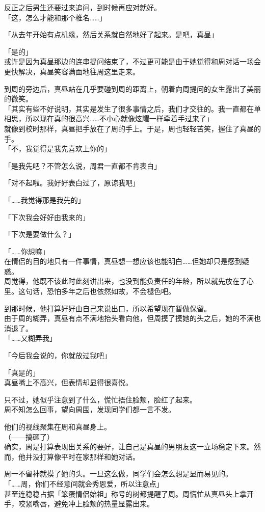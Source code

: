 反正之后男生还要过来追问，到时候再应对就好。\\

「这，怎么才能和那个椎名……」

「从去年开始有点机缘，然后关系就自然地好了起来。是吧，真昼」

「是的」\\

或许是因为真昼那边的连串提问结束了，不过更可能是由于她觉得和周对话一场会更快解决，真昼笑容满面地往周这里走来。

到周的旁边后，真昼站在几乎要碰到周的距离上，朝着向周提问的女生露出了美丽的微笑。\\

「其实有些不好说明，其实是发生了很多事情之后，我们才交往的。我一直都在单相思，所以现在真的很高兴……不小心就像炫耀一样牵着手过来了」\\

就像到校时那样，真昼把手放在了周的手上。于是，周也轻轻苦笑，握住了真昼的手。\\

「不，我觉得是我先喜欢上你的」

「是我先吧？不管怎么说，周君一直都不肯表白」

「对不起啦。我好好表白过了，原谅我吧」

「……我觉得那是我先的」

「下次我会好好由我来的」

「下次是要做什么？」

「……你想嘛」\\

在情侣的目的地只有一件事情，真昼想一想应该也能明白……但她却只是感到疑惑。\\

周觉得，他既不该此时此刻讲出来，也没到能负责任的年龄，所以就先放在了心里。这句话，恐怕多年之后也依然如故，不会褪色吧。

到那时候，他打算好好由自己来说出口，所以希望现在暂做保留。\\

由于周的糊弄，真昼有点不满地抬头看向他，但周摸了摸她的头之后，她的不满也消退了。\\

「……又糊弄我」

「今后我会说的，你就放过我吧」

「真是的」\\

真昼嘴上不高兴，但表情却显得很喜悦。

只不过，她似乎注意到了什么，慌忙捂住脸颊，脸红了起来。\\

周不知怎么回事，望向周围，发现同学们都一言不发。

他们的视线聚集在周和真昼身上。\\

（——搞砸了）\\

确实，周是打算表现出关系的要好，让自己是真昼的男朋友这一立场稳定下来。然而，他并没打算像平时在家那样和她对话。

周一不留神就摸了她的头。一旦这么做，同学们会怎么想是显而易见的。\\

「……周，你们不经意间就会秀恩爱，所以注意点」\\

甚至连稳稳占据「笨蛋情侣始祖」称号的树都提醒了周。周慌忙从真昼头上拿开手，咬紧嘴唇，避免冲上脸颊的热量显露出来。
